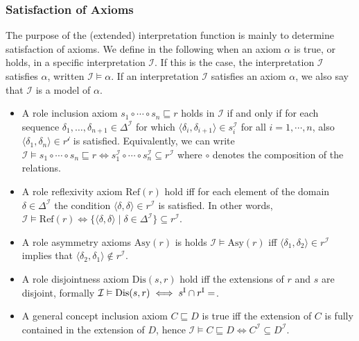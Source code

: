 \subsubsection{Satisfaction of Axioms} \label{satisfaction-of-axioms}

The purpose of the (extended) interpretation function is mainly to determine satisfaction of axioms. We define in the following when an axiom $\alpha$ is true, or holds, in a specific interpretation $\mathcal{I}$. If this is the case, the interpretation $\mathcal{I}$ satisfies $\alpha$, written $\mathcal{I} \vDash \alpha$. If an interpretation $\mathcal{I}$ satisfies an axiom $\alpha$, we also say that $\mathcal{I}$ is a model of $\alpha$.

\begin{itemize}
    \item A role inclusion axiom $s_1 \circ \cdots \circ s_n \sqsubseteq r$ holds in $\mathcal{I}$ if and only if for each sequence $\delta_1, \dots, \delta_{n + 1} \in \Delta^\mathcal{I}$ for which $\langle \delta_i , \delta_{i + 1} \rangle \in s_i^\mathcal{I}$ for all $i = 1, \cdots, n$, also $\langle \delta_1 , \delta_n \rangle \in r^\mathcal{i}$ is satisfied. Equivalently, we can write $\mathcal{I} \vDash s_1 \circ \cdots \circ s_n \sqsubseteq r \iff s_1^\mathcal{I} \circ \cdots \circ s_n^\mathcal{I} \subseteq r^\mathcal{I}$ where $\circ$ denotes the composition of the relations.
    \item A role reflexivity axiom $\mathrm{Ref}(r)$ hold iff for each element of the domain $\delta \in \Delta^\mathcal{I}$ the condition $\langle \delta , \delta \rangle \in r^\mathcal{I}$ is satisfied. In other words, $\mathcal{I} \vDash \mathrm{Ref}(r) \iff \{ \langle \delta, \delta \rangle \mid \delta \in \Delta^\mathcal{I} \} \subseteq r^\mathcal{I}$.
    \item A role asymmetry axioms $\mathrm{Asy}(r)$ is holds $\mathcal{I} \vDash \mathrm{Asy}(r)$ iff $\langle \delta_1 , \delta_2 \rangle \in r^\mathcal{I}$ implies that $\langle \delta_2, \delta_1 \rangle \not\in r^\mathcal{I}$.
    \item A role disjointness axiom $\mathrm{Dis}(s, r)$ hold iff the extensions of $r$ and $s$ are disjoint, formally $\mathcal{I} \vDash \mathrm{Dis}(s, r) \iff s^\mathrm{I} \cap r^\mathrm{I} = \empty$.
    \item A general concept inclusion axiom $C \sqsubseteq D$ is true iff the extension of $C$ is fully contained in the extension of $D$, hence $\mathcal{I} \vDash C \sqsubseteq D \iff C^\mathcal{I} \subseteq D^\mathcal{I}$.

\end{itemize}
